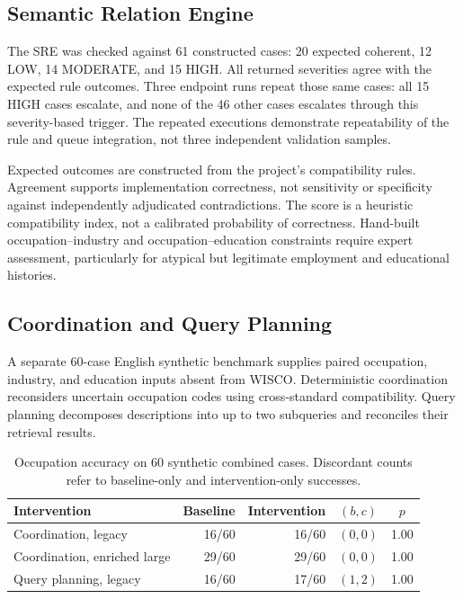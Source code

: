 \subsection{Semantic Relation Engine}
\label{sec:res-sre}

The SRE was checked against 61 constructed cases: 20 expected coherent,
12 LOW, 14 MODERATE, and 15 HIGH. All returned severities agree with the
expected rule outcomes. Three endpoint runs repeat those same cases:
all 15 HIGH cases escalate, and none of the 46 other cases escalates
through this severity-based trigger. The repeated executions demonstrate
repeatability of the rule and queue integration, not three independent
validation samples.

Expected outcomes are constructed from the project's compatibility rules.
Agreement supports implementation correctness, not sensitivity or
specificity against independently adjudicated contradictions. The score
is a heuristic compatibility index, not a calibrated probability of
correctness. Hand-built occupation--industry and occupation--education
constraints require expert assessment, particularly for atypical but
legitimate employment and educational histories.

\subsection{Coordination and Query Planning}
\label{sec:results-coordination}

A separate 60-case English synthetic benchmark supplies paired occupation,
industry, and education inputs absent from WISCO. Deterministic coordination
reconsiders uncertain occupation codes using cross-standard compatibility.
Query planning decomposes descriptions into up to two subqueries and
reconciles their retrieval results.

\begin{table}[htbp]
\centering
\caption{Occupation accuracy on 60 synthetic combined cases. Discordant
counts refer to baseline-only and intervention-only successes.}
\label{tab:ch6-coordination}
\small\renewcommand{\arraystretch}{1.3}
\begin{tabular}{lrrcc}
\toprule
\textbf{Intervention} & \textbf{Baseline} & \textbf{Intervention} & \textbf{$(b,c)$} & \textbf{$p$} \\
\midrule
Coordination, legacy & 16/60 & 16/60 & $(0,0)$ & 1.00 \\
Coordination, enriched large & 29/60 & 29/60 & $(0,0)$ & 1.00 \\
Query planning, legacy & 16/60 & 17/60 & $(1,2)$ & 1.00 \\
\bottomrule
\end{tabular}
\end{table}

